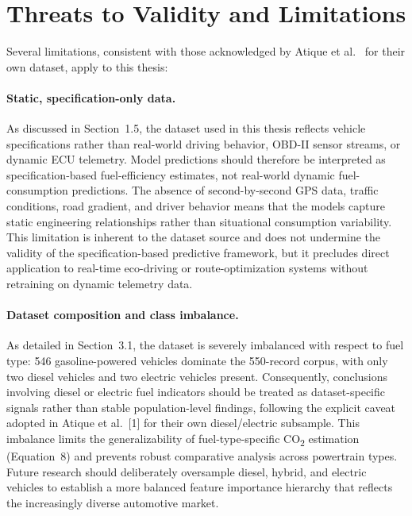 \section{Threats to Validity and Limitations}

Several limitations, consistent with those acknowledged by Atique et al.~\cite{atique2026explainable} for their own dataset, apply to this thesis:

\paragraph{Static, specification-only data.}
As discussed in Section~1.5, the dataset used in this thesis reflects vehicle specifications rather than real-world driving behavior, OBD-II sensor streams, or dynamic ECU telemetry. Model predictions should therefore be interpreted as specification-based fuel-efficiency estimates, not real-world dynamic fuel-consumption predictions. The absence of second-by-second GPS data, traffic conditions, road gradient, and driver behavior means that the models capture static engineering relationships rather than situational consumption variability. This limitation is inherent to the dataset source and does not undermine the validity of the specification-based predictive framework, but it precludes direct application to real-time eco-driving or route-optimization systems without retraining on dynamic telemetry data.

\paragraph{Dataset composition and class imbalance.}
As detailed in Section~3.1, the dataset is severely imbalanced with respect to fuel type: 546 gasoline-powered vehicles dominate the 550-record corpus, with only two diesel vehicles and two electric vehicles present. Consequently, conclusions involving diesel or electric fuel indicators should be treated as dataset-specific signals rather than stable population-level findings, following the explicit caveat adopted in Atique et al.~[1] for their own diesel/electric subsample. This imbalance limits the generalizability of fuel-type-specific CO\textsubscript{2} estimation (Equation~8) and prevents robust comparative analysis across powertrain types. Future research should deliberately oversample diesel, hybrid, and electric vehicles to establish a more balanced feature importance hierarchy that reflects the increasingly diverse automotive market.

